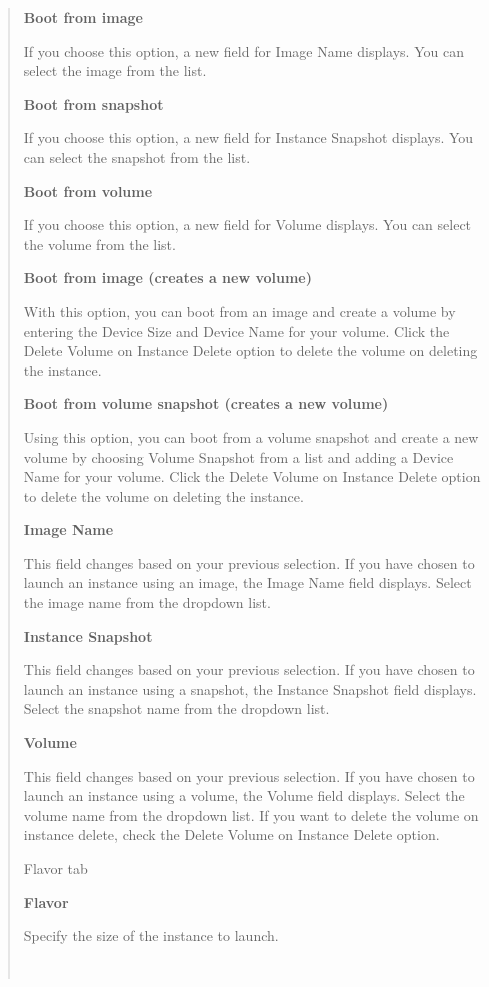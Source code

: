 \begin{quote}
\textbf{Boot from image}

If you choose this option, a new field for Image Name displays. You can
select the image from the list.

\textbf{Boot from snapshot}

If you choose this option, a new field for Instance Snapshot displays.
You can select the snapshot from the list.

\textbf{Boot from volume}

If you choose this option, a new field for Volume displays. You can
select the volume from the list.

\textbf{Boot from image (creates a new volume)}

With this option, you can boot from an image and create a volume by
entering the Device Size and Device Name for your volume. Click the
Delete Volume on Instance Delete option to delete the volume on deleting
the instance.

\textbf{Boot from volume snapshot (creates a new volume)}

Using this option, you can boot from a volume snapshot and create a new
volume by choosing Volume Snapshot from a list and adding a Device Name
for your volume. Click the Delete Volume on Instance Delete option to
delete the volume on deleting the instance.

\textbf{Image Name}

This field changes based on your previous selection. If you have chosen
to launch an instance using an image, the Image Name field displays.
Select the image name from the dropdown list.

\textbf{Instance Snapshot}

This field changes based on your previous selection. If you have chosen
to launch an instance using a snapshot, the Instance Snapshot field
displays. Select the snapshot name from the dropdown list.

\textbf{Volume}

This field changes based on your previous selection. If you have chosen
to launch an instance using a volume, the Volume field displays. Select
the volume name from the dropdown list. If you want to delete the volume
on instance delete, check the Delete Volume on Instance Delete option.

Flavor tab

\textbf{Flavor}

Specify the size of the instance to launch.

~


\end{quote}
